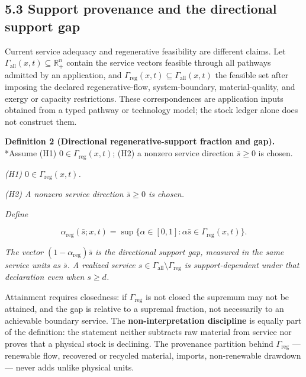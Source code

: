\documentclass[11pt]{article}
\begin{document}
\subsection*{5.3 Support provenance and the directional support gap}\label{53-support-provenance-and-the-directional-support-gap}

Current service adequacy and regenerative feasibility are different claims. Let \(\Gamma_{\mathrm{all}}(x,\allowbreak{}t) \subseteq \mathbb{R}^n_+\allowbreak{}\) contain the service vectors feasible through all pathways admitted by an application, and \(\Gamma_{\mathrm{reg}}(x,\allowbreak{}t) \subseteq \Gamma_{\mathrm{all}}(x,\allowbreak{}t)\) the feasible set after imposing the declared regenerative-flow, system-boundary, material-quality, and exergy or capacity restrictions. These correspondences are application inputs obtained from a typed pathway or technology model; the stock ledger alone does not construct them.

\textbf{Definition 2 (Directional regenerative-support fraction and gap).} *Assume (H1) \(0\in\Gamma_{\mathrm{reg}}(x,\allowbreak{}t)\); (H2) a nonzero service direction \(\bar s\ge0\) is chosen.

\emph{(H1) \(0 \in \Gamma_{\mathrm{reg}}(x,\allowbreak{}t)\).}

\emph{(H2) A nonzero service direction \(\bar s \ge 0\) is chosen.}

\emph{Define} 

$$\alpha_{\mathrm{reg}}(\bar s; x, t) = \sup\{ \alpha \in [0,1] : \alpha \bar s \in \Gamma_{\mathrm{reg}}(x,t) \}.$$

 \emph{The vector \((1 - \alpha_{\mathrm{reg}})\bar s\) is the directional support gap, measured in the same service units as \(\bar s\). A realized service \(s \in \Gamma_{\mathrm{all}} \setminus \Gamma_{\mathrm{reg}}\) is support-dependent under that declaration even when \(s \ge d\).}

Attainment requires closedness: if \(\Gamma_{\mathrm{reg}}\) is not closed the supremum may not be attained, and the gap is relative to a supremal fraction, not necessarily to an achievable boundary service. The \textbf{non-interpretation discipline} is equally part of the definition: the statement neither subtracts raw material from service nor proves that a physical stock is declining. The provenance partition behind \(\Gamma_{\mathrm{reg}}\) --- renewable flow, recovered or recycled material, imports, non-renewable drawdown --- never adds unlike physical units.
\end{document}
